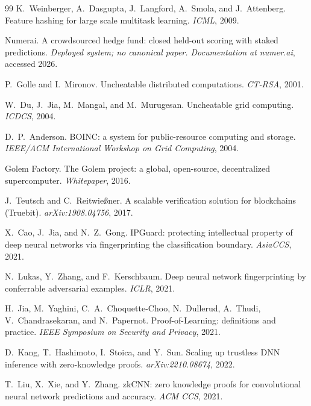 \documentclass[11pt]{article}
\begin{document}
\begin{thebibliography}{99}
    K.~Weinberger, A.~Dasgupta, J.~Langford, A.~Smola, and
    J.~Attenberg.
    Feature hashing for large scale multitask learning.
    \emph{ICML}, 2009.

    Numerai.
    A crowdsourced hedge fund: closed held-out scoring with staked
    predictions.
    \emph{Deployed system; no canonical paper. Documentation at
        numer.ai}, accessed 2026.

    P.~Golle and I.~Mironov.
    Uncheatable distributed computations.
    \emph{CT-RSA}, 2001.

    W.~Du, J.~Jia, M.~Mangal, and M.~Murugesan.
    Uncheatable grid computing.
    \emph{ICDCS}, 2004.

    D.~P.~Anderson.
    BOINC: a system for public-resource computing and storage.
    \emph{IEEE/ACM International Workshop on Grid Computing}, 2004.

    Golem Factory.
    The Golem project: a global, open-source, decentralized
    supercomputer.
    \emph{Whitepaper}, 2016.

    J.~Teutsch and C.~Reitwie\ss ner.
    A scalable verification solution for blockchains (Truebit).
    \emph{arXiv:1908.04756}, 2017.

    X.~Cao, J.~Jia, and N.~Z.~Gong.
    IPGuard: protecting intellectual property of deep neural networks
    via fingerprinting the classification boundary.
    \emph{AsiaCCS}, 2021.

    N.~Lukas, Y.~Zhang, and F.~Kerschbaum.
    Deep neural network fingerprinting by conferrable adversarial
    examples.
    \emph{ICLR}, 2021.

    H.~Jia, M.~Yaghini, C.~A.~Choquette-Choo, N.~Dullerud, A.~Thudi,
    V.~Chandrasekaran, and N.~Papernot.
    Proof-of-Learning: definitions and practice.
    \emph{IEEE Symposium on Security and Privacy}, 2021.

    D.~Kang, T.~Hashimoto, I.~Stoica, and Y.~Sun.
    Scaling up trustless DNN inference with zero-knowledge proofs.
    \emph{arXiv:2210.08674}, 2022.

    T.~Liu, X.~Xie, and Y.~Zhang.
    zkCNN: zero knowledge proofs for convolutional neural network
    predictions and accuracy.
    \emph{ACM CCS}, 2021.


\end{thebibliography}
\end{document}
